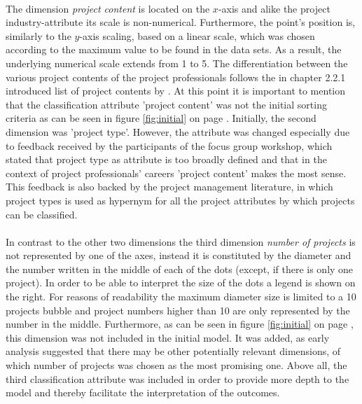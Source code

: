 \\[.1cm]
The dimension \textit{project content} is located on the $x$-axis and alike the project industry-attribute its scale is non-numerical. Furthermore, the point's position is, similarly to the $y$-axis scaling, based on a linear scale, which was chosen according to the maximum value to be found in the data sets. As a result, the underlying numerical scale extends from 1 to 5. The differentiation between the various project contents of the project professionals follows the in chapter 2.2.1 introduced list of project contents by . At this point it is important to mention that the classification attribute 'project content' was not the initial sorting criteria as can be seen in figure \ref{fig:initial} on page \pageref{fig:initial}. Initially, the second dimension was 'project type'. However, the attribute was changed especially due to feedback received by the participants of the focus group workshop, which stated that project type as attribute is too broadly defined and that in the context of project professionals' careers 'project content' makes the most sense. This feedback is also backed by the project management literature, in which project types is used as hypernym for all the project attributes by which projects can be classified. \\

\\[.1cm]
In contrast to the other two dimensions the third dimension \textit{number of projects} is not represented by one of the axes, instead it is constituted by the diameter and the number written in the middle of each of the dots (except, if there is only one project). In order to be able to interpret the size of the dots a legend is shown on the right. For reasons of readability the maximum diameter size is limited to a 10 projects bubble and project numbers higher than 10 are only represented by the number in the middle. Furthermore, as can be seen in figure \ref{fig:initial} on page \pageref{fig:initial}, this dimension was not included in the initial model. 
It was added, as early analysis suggested that there may be other potentially relevant dimensions, of which number of projects was chosen as the most promising one. Above all, the third classification attribute was included in order to provide more depth to the model and thereby facilitate the interpretation of the outcomes. \\

